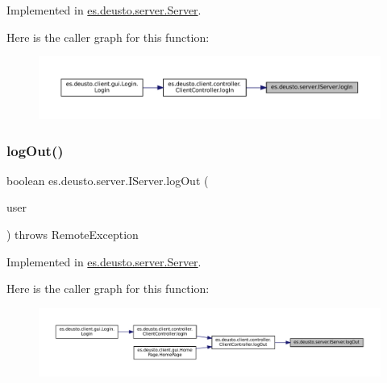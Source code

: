Implemented in \mbox{\hyperlink{classes_1_1deusto_1_1server_1_1_server_ab93f5cc9b5825192c31cd2088014378d}{es.\+deusto.\+server.\+Server}}.

Here is the caller graph for this function\+:
\nopagebreak
\begin{figure}[H]
\begin{center}
\leavevmode
\includegraphics[width=350pt]{interfacees_1_1deusto_1_1server_1_1_i_server_a62db155ac744b9712e303ceea76a3560_icgraph}
\end{center}
\end{figure}
\mbox{\label{interfacees_1_1deusto_1_1server_1_1_i_server_a479231082cae13f9c651c0ec2cb2cece}} 
\subsubsection{\texorpdfstring{logOut()}{logOut()}}
{\footnotesize\ttfamily boolean es.\+deusto.\+server.\+I\+Server.\+log\+Out (\begin{DoxyParamCaption}\item[{\mbox{\hyperlink{classes_1_1deusto_1_1server_1_1data_1_1_user_d_t_o}{User\+D\+TO}}}]{user }\end{DoxyParamCaption}) throws Remote\+Exception}



Implemented in \mbox{\hyperlink{classes_1_1deusto_1_1server_1_1_server_a92cf8a599adfa6a34f7cfe788119cf0a}{es.\+deusto.\+server.\+Server}}.

Here is the caller graph for this function\+:
\nopagebreak
\begin{figure}[H]
\begin{center}
\leavevmode
\includegraphics[width=350pt]{interfacees_1_1deusto_1_1server_1_1_i_server_a479231082cae13f9c651c0ec2cb2cece_icgraph}
\end{center}
\end{figure}
\mbox{\label{interfacees_1_1deusto_1_1server_1_1_i_server_a998e20655e760b135fab601a417aa5ae}} 
